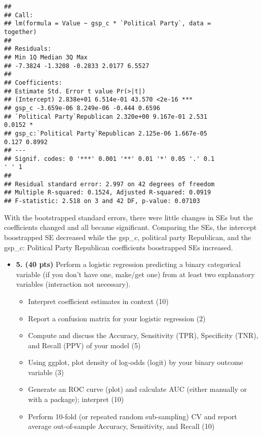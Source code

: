 \documentclass[]{article}
\providecommand{\tightlist}{%
  \setlength{\itemsep}{0pt}\setlength{\parskip}{0pt}}
\begin{document}
\begin{verbatim}
##
## Call:
## lm(formula = Value ~ gsp_c * `Political Party`, data =
together)
##
## Residuals:
## Min 1Q Median 3Q Max
## -7.3824 -1.3208 -0.2833 2.0177 6.5527
##
## Coefficients:
## Estimate Std. Error t value Pr(>|t|)
## (Intercept) 2.838e+01 6.514e-01 43.570 <2e-16 ***
## gsp_c -3.659e-06 8.249e-06 -0.444 0.6596
## `Political Party`Republican 2.320e+00 9.167e-01 2.531
0.0152 *
## gsp_c:`Political Party`Republican 2.125e-06 1.667e-05
0.127 0.8992
## ---
## Signif. codes: 0 '***' 0.001 '**' 0.01 '*' 0.05 '.' 0.1
' ' 1
##
## Residual standard error: 2.997 on 42 degrees of freedom
## Multiple R-squared: 0.1524, Adjusted R-squared: 0.0919
## F-statistic: 2.518 on 3 and 42 DF, p-value: 0.07103
\end{verbatim}

With the bootstrapped standard errors, there were little changes in SEs
but the coefficients changed and all became significant. Comparing the
SEs, the intercept boostrapped SE decreased while the gsp\_c, political
party Republican, and the gsp\_c: Political Party Republican
coefficients boostrapped SEs increased.

\begin{itemize}
\item
  \textbf{5. (40 pts)} Perform a logistic regression predicting a binary
  categorical variable (if you don't have one, make/get one) from at
  least two explanatory variables (interaction not necessary).

  \begin{itemize}
  \tightlist
  \item
    Interpret coefficient estimates in context (10)
  \item
    Report a confusion matrix for your logistic regression (2)
  \item
    Compute and discuss the Accuracy, Sensitivity (TPR), Specificity
    (TNR), and Recall (PPV) of your model (5)
  \item
    Using ggplot, plot density of log-odds (logit) by your binary
    outcome variable (3)
  \item
    Generate an ROC curve (plot) and calculate AUC (either manually or
    with a package); interpret (10)
  \item
    Perform 10-fold (or repeated random sub-sampling) CV and report
    average out-of-sample Accuracy, Sensitivity, and Recall (10)
  \end{itemize}
\end{itemize}
\end{document}
